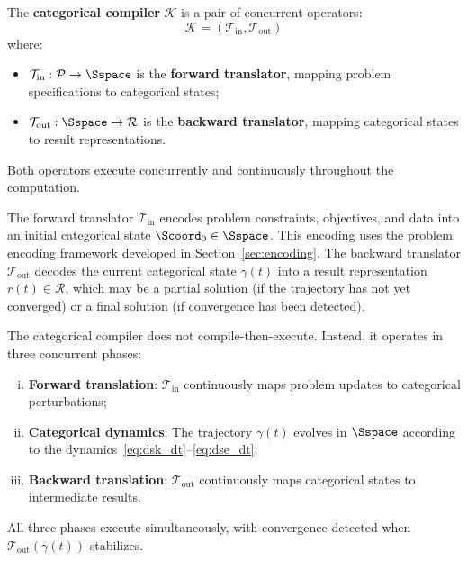 \begin{definition}
\label{def:categorical_compiler}
The \textbf{categorical compiler} $\mathcal{K}$ is a pair of concurrent operators:
\begin{equation}
\mathcal{K} = (\mathcal{T}_{\text{in}}, \mathcal{T}_{\text{out}})
\end{equation}
where:
\begin{itemize}
    \item $\mathcal{T}_{\text{in}}: \mathcal{P} \to \Sspace$ is the \textbf{forward translator}, mapping problem specifications to categorical states;
    \item $\mathcal{T}_{\text{out}}: \Sspace \to \mathcal{R}$ is the \textbf{backward translator}, mapping categorical states to result representations.
\end{itemize}
Both operators execute concurrently and continuously throughout the computation.
\end{definition}

The forward translator $\mathcal{T}_{\text{in}}$ encodes problem constraints, objectives, and data into an initial categorical state $\Scoord_0 \in \Sspace$. This encoding uses the problem encoding framework developed in Section~\ref{sec:encoding}. The backward translator $\mathcal{T}_{\text{out}}$ decodes the current categorical state $\gamma(t)$ into a result representation $r(t) \in \mathcal{R}$, which may be a partial solution (if the trajectory has not yet converged) or a final solution (if convergence has been detected).

\begin{theorem}
\label{thm:bidirectional}
The categorical compiler does not compile-then-execute. Instead, it operates in three concurrent phases:
\begin{enumerate}[(i)]
    \item \textbf{Forward translation}: $\mathcal{T}_{\text{in}}$ continuously maps problem updates to categorical perturbations;
    \item \textbf{Categorical dynamics}: The trajectory $\gamma(t)$ evolves in $\Sspace$ according to the dynamics~\eqref{eq:dsk_dt}--\eqref{eq:dse_dt};
    \item \textbf{Backward translation}: $\mathcal{T}_{\text{out}}$ continuously maps categorical states to intermediate results.
\end{enumerate}
All three phases execute simultaneously, with convergence detected when $\mathcal{T}_{\text{out}}(\gamma(t))$ stabilizes.
\end{theorem}

